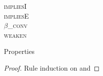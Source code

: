 \begin{frame}
    \begin{isabelle}
    \begin{center}{
         {\textsc{impliesI}}\\[1ex]
         {\textsc{impliesE}}\\[1ex]
         {\textsc{\(\beta\)\_conv}}\\[1ex]
         {\textsc{weaken}}
        }
      \end{center}
    \end{isabelle}
\end{frame}

\begin{frame}{Properties}
    \begin{theorem}
    \end{theorem}
    \begin{theorem}
    \end{theorem}
    \begin{proof}
        Rule induction on \isa{\(\Gamma\)} and 
    \end{proof}
\end{frame}